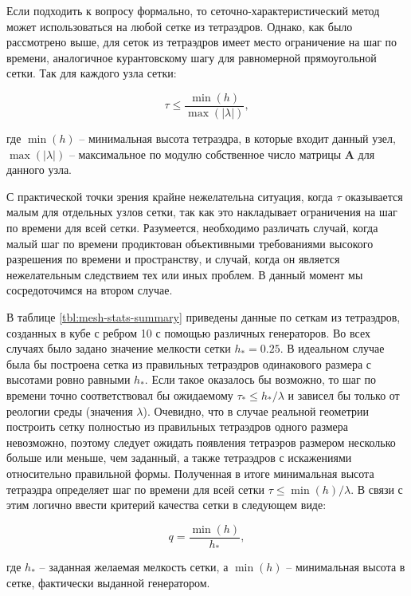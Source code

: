 Если подходить к вопросу формально, то сеточно-характеристический метод может использоваться на любой сетке из тетраэдров. Однако, как было рассмотрено выше, для сеток из тетраэдров имеет место ограничение на шаг по времени, аналогичное курантовскому шагу для равномерной прямоугольной сетки. Так для каждого узла сетки:

\begin{equation}
\tau \le \frac{\min(h)}{\max(|\lambda|)},
\end{equation}

где $\min(h)$ -- минимальная высота тетраэдра, в которые входит данный узел, $\max(|\lambda|)$ -- максимальное по модулю собственное число матрицы $\mathbf A$ для данного узла.

С практической точки зрения крайне нежелательна ситуация, когда $\tau$ оказывается малым для отдельных узлов сетки, так как это накладывает ограничения на шаг по времени для всей сетки. Разумеется, необходимо различать случай, когда малый шаг по времени продиктован объективными требованиями высокого разрешения по времени и пространству, и случай, когда он является нежелательным следствием тех или иных проблем. В данный момент мы сосредоточимся на втором случае.

В таблице \ref{tbl:mesh-stats-summary} приведены данные по сеткам из тетраэдров, созданных в кубе с ребром 10 с помощью различных генераторов. Во всех случаях было задано значение мелкости сетки $h_* = 0.25$. В идеальном случае была бы построена сетка из правильных тетраэдров одинакового размера с высотами ровно равными $h_*$. Если такое оказалось бы возможно, то шаг по времени точно соответствовал бы ожидаемому $\tau_* \le h_* / \lambda$ и зависел бы только от реологии среды (значения $\lambda$). Очевидно, что в случае реальной геометрии построить сетку полностью из правильных тетраэдров одного размера невозможно, поэтому следует ожидать появления тетраэров размером несколько больше или меньше, чем заданный, а также тетраэдров с искажениями относительно правильной формы. Полученная в итоге минимальная высота тетраэдра определяет шаг по времени для всей сетки $\tau \le \min(h) / \lambda$. В связи с этим логично ввести критерий качества сетки в следующем виде:

\begin{equation}
q = \frac{\min(h)}{h_*},
\end{equation}

где $h_*$ -- заданная желаемая мелкость сетки, а $\min(h)$ -- минимальная высота в сетке, фактически выданной генератором.

